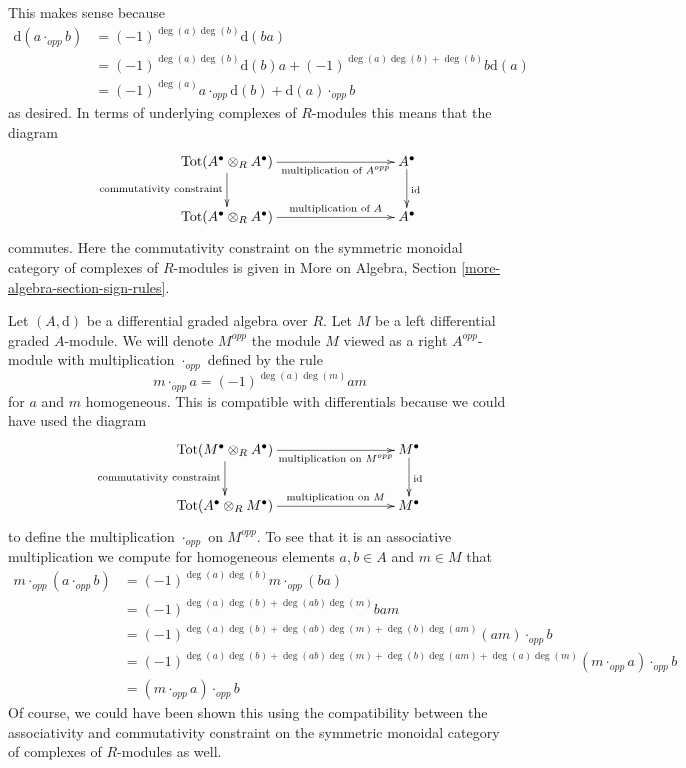 \noindent
This makes sense because
\begin{align*}
\text{d}(a \cdot_{opp} b)
& =
(-1)^{\deg(a)\deg(b)} \text{d}(b a) \\
& =
(-1)^{\deg(a)\deg(b)} \text{d}(b) a +
(-1)^{\deg(a)\deg(b) + \deg(b)}b\text{d}(a) \\
& =
(-1)^{\deg(a)}a \cdot_{opp} \text{d}(b) + \text{d}(a) \cdot_{opp} b
\end{align*}
as desired. In terms of underlying complexes of $R$-modules
this means that the diagram
$$
\xymatrix{
\text{Tot}(A^\bullet \otimes_R A^\bullet)
\ar[rrr]_-{\text{multiplication of }A^{opp}}
\ar[d]_{\text{commutativity constraint}} & & &
A^\bullet \ar[d]^{\text{id}} \\
\text{Tot}(A^\bullet \otimes_R A^\bullet)
\ar[rrr]^-{\text{multiplication of }A} & & &
A^\bullet
}
$$
commutes. Here the commutativity constraint on the symmetric monoidal
category of complexes of $R$-modules is given in
More on Algebra, Section \ref{more-algebra-section-sign-rules}.

\medskip\noindent
Let $(A, \text{d})$ be a differential graded algebra over $R$.
Let $M$ be a left differential graded $A$-module. We will denote
$M^{opp}$ the module $M$ viewed as a right $A^{opp}$-module with
multiplication $\cdot_{opp}$ defined by the rule
$$
m \cdot_{opp} a = (-1)^{\deg(a)\deg(m)} a m
$$
for $a$ and $m$ homogeneous. This is compatible with differentials
because we could have used the diagram
$$
\xymatrix{
\text{Tot}(M^\bullet \otimes_R A^\bullet)
\ar[rrr]_-{\text{multiplication on }M^{opp}}
\ar[d]_{\text{commutativity constraint}} & & &
M^\bullet \ar[d]^{\text{id}} \\
\text{Tot}(A^\bullet \otimes_R M^\bullet)
\ar[rrr]^-{\text{multiplication on }M} & & &
M^\bullet
}
$$
to define the multiplication $\cdot_{opp}$ on $M^{opp}$.
To see that it is an associative multiplication we compute for
homogeneous elements $a, b \in A$ and $m \in M$ that
\begin{align*}
m \cdot_{opp} (a \cdot_{opp} b)
& =
(-1)^{\deg(a)\deg(b)} m \cdot_{opp} (ba) \\
& =
(-1)^{\deg(a)\deg(b) + \deg(ab)\deg(m)} bam \\
& =
(-1)^{\deg(a)\deg(b) + \deg(ab)\deg(m) + \deg(b)\deg(am)}
(am) \cdot_{opp} b \\
& =
(-1)^{\deg(a)\deg(b) + \deg(ab)\deg(m) + \deg(b)\deg(am) + \deg(a)\deg(m)}
(m \cdot_{opp} a) \cdot_{opp} b \\
& =
(m \cdot_{opp} a) \cdot_{opp} b
\end{align*}
Of course, we could have been shown this using the compatibility between
the associativity and commutativity constraint on the symmetric monoidal
category of complexes of $R$-modules as well.

